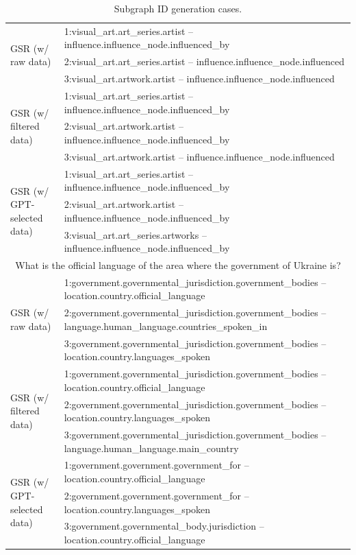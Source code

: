 \begin{table}[h]
\begin{tabular}{lp{11cm}}
\multirow{3}{*}{GSR (w/ raw data)} & 1:visual\_art.art\_series.artist -- influence.influence\_node.influenced\_by \\
& 2:visual\_art.art\_series.artist -- influence.influence\_node.influenced \\
& 3:visual\_art.artwork.artist -- influence.influence\_node.influenced \\
\midrule
\multirow{3}{*}{GSR (w/ filtered data)} & 1:visual\_art.art\_series.artist -- influence.influence\_node.influenced\_by \\
& 2:visual\_art.artwork.artist -- influence.influence\_node.influenced\_by \\
& 3:visual\_art.artwork.artist -- influence.influence\_node.influenced \\
\midrule
\multirow{3}{*}{GSR (w/ GPT-selected data)} & 1:visual\_art.art\_series.artist -- influence.influence\_node.influenced\_by \\
& 2:visual\_art.artwork.artist -- influence.influence\_node.influenced\_by \\
& 3:visual\_art.art\_series.artworks -- influence.influence\_node.influenced\_by \\
\midrule
\multicolumn{2}{c}{What is the official language of the area where the government of Ukraine is?} \\ \midrule
\multirow{3}{*}{GSR (w/ raw data)} & 1:government.governmental\_jurisdiction.government\_bodies -- location.country.official\_language \\
& 2:government.governmental\_jurisdiction.government\_bodies -- language.human\_language.countries\_spoken\_in \\
& 3:government.governmental\_jurisdiction.government\_bodies -- location.country.languages\_spoken \\
\midrule
\multirow{3}{*}{GSR (w/ filtered data)} & 1:government.governmental\_jurisdiction.government\_bodies -- location.country.official\_language \\
& 2:government.governmental\_jurisdiction.government\_bodies -- location.country.languages\_spoken \\
& 3:government.governmental\_jurisdiction.government\_bodies -- language.human\_language.main\_country \\
\midrule
\multirow{3}{*}{GSR (w/ GPT-selected data)} & 1:government.government.government\_for -- location.country.official\_language \\
& 2:government.government.government\_for -- location.country.languages\_spoken \\
& 3:government.governmental\_body.jurisdiction -- location.country.official\_language \\


    \bottomrule
    \end{tabular}
    \caption{Subgraph ID generation cases.}
    \label{tab:subgraphid_case}
\end{table}

